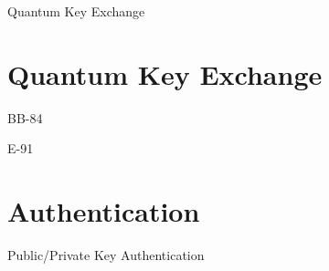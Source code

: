\documentclass{beamer}
\begin{document}
	\begin{frame}{Quantum Key Exchange}
		
	\end{frame}
	
	\section{Quantum Key Exchange}
	
	\begin{frame}{BB-84}
		
	\end{frame}
	
	\begin{frame}{E-91}
		
	\end{frame}
	
	\section{Authentication}
	
	\begin{frame}{Public/Private Key Authentication}
		
	\end{frame}
	
	

	\begin{frame}[plain]\end{frame}
	
\end{document}
